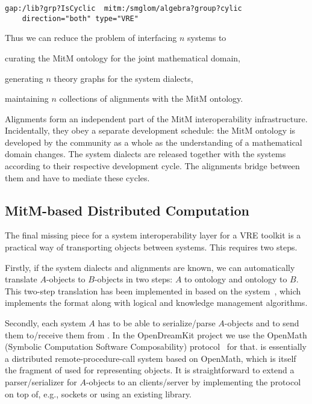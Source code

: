 \begin{verbatim}
gap:/lib?grp?IsCyclic  mitm:/smglom/algebra?group?cylic
    direction="both" type="VRE"
\end{verbatim}

Thus we can reduce the problem of interfacing $n$ systems to
\begin{inparaenum}[\em i\rm)]
\item curating the MitM ontology for the joint mathematical domain,
\item generating $n$ theory graphs for the system dialects,
\item maintaining $n$ collections of alignments with the MitM ontology.
\end{inparaenum}

Alignments form an independent part of the MitM interoperability infrastructure.
Incidentally, they obey a separate development schedule: the MitM ontology is developed by the community as a whole as the understanding of a mathematical domain changes.
The system dialects are released together with the systems according to their respective development cycle.
The alignments bridge between them and have to mediate these cycles.

\subsection{MitM-based Distributed Computation}\label{sec:mitm:comms}

The final missing piece for a system interoperability layer for a VRE toolkit is a practical way of transporting objects between systems.
This requires two steps.

Firstly, if the system dialects and alignments are known, we can automatically translate $A$-objects to $B$-objects in two steps: $A$ to ontology and ontology to $B$.
This two-step translation has been implemented in \cite{MueRoYuRa:abtafs17} based on the \MMT system~\cite{Rabe:MAGMS13,uniformal:on}, which implements the \OMMT format along with logical and knowledge management algorithms.

Secondly, each system $A$ has to be able to serialize/parse $A$-objects and to send them to/receive them from \MMT.
In the OpenDreamKit project we use the OpenMath \SCSCP (Symbolic Computation Software Composability) protocol~\cite{SCSCP-1.3} for that. 
\SCSCP is essentially a distributed remote-procedure-call system based on OpenMath, which is itself the fragment of \OMMT used for representing objects.
It is straightforward to extend a parser/serializer for $A$-objects to an \SCSCP clients/server by implementing the \SCSCP protocol on top of, e.g., sockets or using an existing \SCSCP library. 


